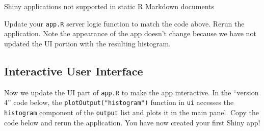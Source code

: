 \documentclass[]{krantz}
\begin{document}
Shiny applications not supported in static R Markdown documents

Update your \texttt{app.R} server logic function to match the code above. Rerun the application. Note the appearance of the app doesn't change because we have not updated the UI portion with the resulting histogram.

\hypertarget{interactive-user-interface}{%
\subsection{Interactive User Interface}\label{interactive-user-interface}}

Now we update the UI part of \texttt{app.R} to make the app interactive. In the ``version 4'' code below, the \texttt{plotOutput("histogram")} function in \texttt{ui} accesses the \texttt{histogram} component of the \texttt{output} list and plots it in the main panel. Copy the code below and rerun the application. You have now created your first Shiny app!
\end{document}

